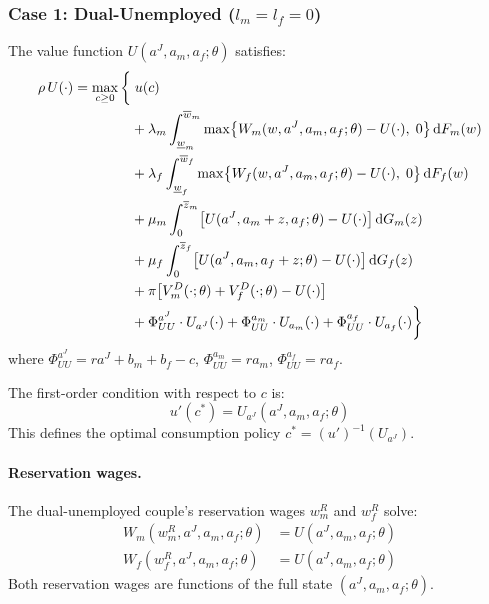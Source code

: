 \documentclass[11pt]{article}
\newcommand{\aJ}{a^{J}}
\newcommand{\wR}{w^{R}}
\newcommand{\dF}{\,\mathrm{d}F}
\newcommand{\dG}{\,\mathrm{d}G}
\begin{document}
\subsubsection{Case 1: Dual-Unemployed ($l_m = l_f = 0$)}

The value function $U(\aJ, a_m, a_f; \theta)$ satisfies:
\begin{align}
    \rho\, U(\cdot) = \max_{c \geq 0} \bigg\{
    &\; u(c) \notag\\
    &+ \lambda_m \int_{\underline{w}_m}^{\overline{w}_m} \max\bigl\{W_m(w, \aJ, a_m, a_f;\theta) - U(\cdot),\; 0\bigr\} \dF_m(w) \notag\\
    &+ \lambda_f \int_{\underline{w}_f}^{\overline{w}_f} \max\bigl\{W_f(w, \aJ, a_m, a_f;\theta) - U(\cdot),\; 0\bigr\} \dF_f(w) \notag\\
    &+ \mu_m \int_0^{\overline{z}_m} \bigl[U(\aJ, a_m + z, a_f;\theta) - U(\cdot)\bigr] \dG_m(z) \notag\\
    &+ \mu_f \int_0^{\overline{z}_f} \bigl[U(\aJ, a_m, a_f + z;\theta) - U(\cdot)\bigr] \dG_f(z) \notag\\
    &+ \pi \bigl[V_m^D(\cdot;\theta) + V_f^D(\cdot;\theta) - U(\cdot)\bigr] \notag\\
    &+ \Phi^{\aJ}_{UU} \cdot U_{\aJ}(\cdot)
     + \Phi^{a_m}_{UU} \cdot U_{a_m}(\cdot)
     + \Phi^{a_f}_{UU} \cdot U_{a_f}(\cdot)
    \bigg\}
    \label{eq:HJB_UU}
\end{align}
where $\Phi^{\aJ}_{UU} = r\aJ + b_m + b_f - c$, $\Phi^{a_m}_{UU} = r a_m$, $\Phi^{a_f}_{UU} = r a_f$.

The first-order condition with respect to $c$ is:
\begin{equation}
    u'(c^*) = U_{\aJ}(\aJ, a_m, a_f;\theta)
    \label{eq:FOC_UU}
\end{equation}
This defines the optimal consumption policy $c^* = (u')^{-1}(U_{\aJ})$.

\paragraph{Reservation wages.} The dual-unemployed couple's reservation wages $\wR_m$ and $\wR_f$ solve:
\begin{align*}
    W_m(\wR_m, \aJ, a_m, a_f;\theta) &= U(\aJ, a_m, a_f;\theta) \\
    W_f(\wR_f, \aJ, a_m, a_f;\theta) &= U(\aJ, a_m, a_f;\theta)
\end{align*}
Both reservation wages are functions of the full state $(\aJ, a_m, a_f;\theta)$.
\end{document}
